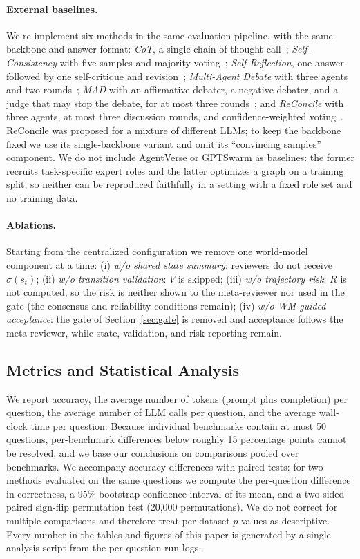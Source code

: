 \paragraph{External baselines.}
We re-implement six methods in the same evaluation pipeline, with the same backbone and answer format:
\emph{CoT}, a single chain-of-thought call~\cite{wei2022chain};
\emph{Self-Consistency} with five samples and majority voting~\cite{wang2023selfconsistency};
\emph{Self-Reflection}, one answer followed by one self-critique and revision~\cite{madaan2023selfrefine,shinn2023reflexion};
\emph{Multi-Agent Debate} with three agents and two rounds~\cite{du2024improving};
\emph{MAD} with an affirmative debater, a negative debater, and a judge that may stop the debate, for at most three rounds~\cite{liang2024mad};
and \emph{ReConcile} with three agents, at most three discussion rounds, and confidence-weighted voting~\cite{chen2024reconcile}.
ReConcile was proposed for a mixture of different LLMs; to keep the backbone fixed we use its single-backbone variant and omit its ``convincing samples'' component.
We do not include AgentVerse or GPTSwarm as baselines: the former recruits task-specific expert roles and the latter optimizes a graph on a training split, so neither can be reproduced faithfully in a setting with a fixed role set and no training data.

\paragraph{Ablations.}
Starting from the centralized configuration we remove one world-model component at a time:
(i) \emph{w/o shared state summary}: reviewers do not receive \(\sigma(s_t)\);
(ii) \emph{w/o transition validation}: \(V\) is skipped;
(iii) \emph{w/o trajectory risk}: \(R\) is not computed, so the risk is neither shown to the meta-reviewer nor used in the gate (the consensus and reliability conditions remain);
(iv) \emph{w/o WM-guided acceptance}: the gate of Section~\ref{sec:gate} is removed and acceptance follows the meta-reviewer, while state, validation, and risk reporting remain.

\subsection{Metrics and Statistical Analysis}

We report accuracy, the average number of tokens (prompt plus completion) per question, the average number of LLM calls per question, and the average wall-clock time per question.
Because individual benchmarks contain at most 50 questions, per-benchmark differences below roughly 15 percentage points cannot be resolved, and we base our conclusions on comparisons pooled over benchmarks. We accompany accuracy differences with paired tests: for two methods evaluated on the same questions we compute the per-question difference in correctness, a 95\% bootstrap confidence interval of its mean, and a two-sided paired sign-flip permutation test (20{,}000 permutations).
We do not correct for multiple comparisons and therefore treat per-dataset \(p\)-values as descriptive.
Every number in the tables and figures of this paper is generated by a single analysis script from the per-question run logs.
